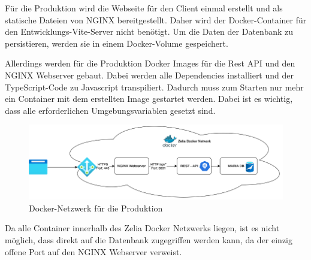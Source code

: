 
Für die Produktion wird die Webseite für den Client einmal erstellt und als statische Dateien von NGINX bereitgestellt. Daher wird der Docker-Container für den Entwicklungs-Vite-Server nicht benötigt. Um die Daten der Datenbank zu persistieren, werden sie in einem Docker-Volume gespeichert. 

Allerdings werden für die Produktion Docker Images für die Rest API und den NGINX Webserver gebaut. Dabei werden alle Dependencies installiert und der TypeScript-Code zu Javascript transpiliert. Dadurch muss zum Starten nur mehr ein Container mit dem erstellten Image gestartet werden. Dabei ist es wichtig, dass alle erforderlichen Umgebungsvariablen gesetzt sind.

\begin{figure}[H]
    \centering
    \includegraphics{media/Docker/ProdNetwork.png}
    \caption{Docker-Netzwerk für die Produktion}
\end{figure}

Da alle Container innerhalb des Zelia Docker Netzwerks liegen, ist es nicht möglich, dass direkt auf die Datenbank zugegriffen werden kann, da der einzig offene Port auf den NGINX Webserver verweist. 


